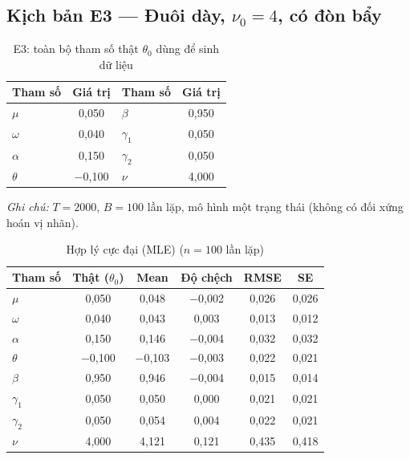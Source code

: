 \documentclass[11pt,a4paper]{article}
\begin{document}
\bigskip

\subsection*{Kịch bản E3 --- Đuôi dày, $\nu_0=4$, có đòn bẩy}
\begin{table}[H]\centering\small
\caption{E3: toàn bộ tham số thật $\theta_0$ dùng để sinh dữ liệu}
\begin{tabularx}{\textwidth}{l C  l C}
\toprule
\textbf{Tham số} & \textbf{Giá trị} & \textbf{Tham số} & \textbf{Giá trị} \\
\midrule
$\mu$ & 0,050 & $\beta$ & 0,950 \\
$\omega$ & 0,040 & $\gamma_1$ & 0,050 \\
$\alpha$ & 0,150 & $\gamma_2$ & 0,050 \\
$\theta$ & $-$0,100 & $\nu$ & 4,000 \\
\bottomrule
\end{tabularx}
\vspace{0.2em}\raggedright\scriptsize \emph{Ghi chú:} $T=2000$, $B=100$ lần lặp, mô hình một trạng thái (không có đối xứng hoán vị nhãn).
\end{table}

\begin{table}[H]\centering\scriptsize
\caption{Hợp lý cực đại (MLE) ($n=100$ lần lặp)}
\begin{tabularx}{\textwidth}{l C C C C C}
\toprule
\textbf{Tham số} & \textbf{Thật ($\theta_0$)} & \textbf{Mean} & \textbf{Độ chệch} & \textbf{RMSE} & \textbf{SE} \\
\midrule
$\mu$ & 0,050 & 0,048 & $-$0,002 & 0,026 & 0,026 \\
$\omega$ & 0,040 & 0,043 & 0,003 & 0,013 & 0,012 \\
$\alpha$ & 0,150 & 0,146 & $-$0,004 & 0,032 & 0,032 \\
$\theta$ & $-$0,100 & $-$0,103 & $-$0,003 & 0,022 & 0,021 \\
$\beta$ & 0,950 & 0,946 & $-$0,004 & 0,015 & 0,014 \\
$\gamma_1$ & 0,050 & 0,050 & 0,000 & 0,021 & 0,021 \\
$\gamma_2$ & 0,050 & 0,054 & 0,004 & 0,022 & 0,021 \\
$\nu$ & 4,000 & 4,121 & 0,121 & 0,435 & 0,418 \\
\bottomrule
\end{tabularx}
\end{table}
\end{document}
